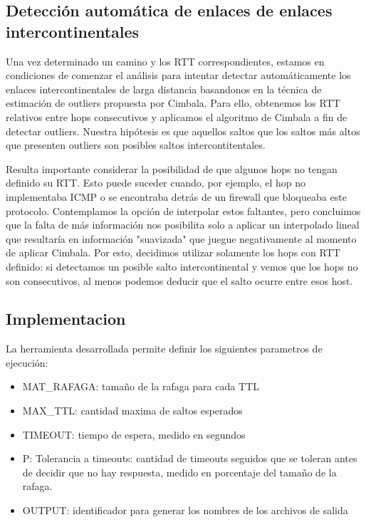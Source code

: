 \subsection{Detección automática de enlaces de enlaces intercontinentales}

Una vez determinado un camino y los RTT correspondientes, estamos en condiciones de comenzar el análisis para intentar detectar automáticamente los enlaces intercontinentales de larga distancia basandonos en la técnica de estimación de outliers propuesta por Cimbala. Para ello, obtenemos los RTT relativos entre hops consecutivos y aplicamos el algoritmo de Cimbala a fin de detectar outliers. Nuestra hipótesis es que aquellos saltos que los saltos más altos que presenten outliers son posibles saltos intercontitentales. 

Resulta importante  considerar la posibilidad de que algunos hops no tengan definido su RTT. Esto puede suceder cuando, por ejemplo, el hop no implementaba ICMP o se encontraba detrás de un firewall que bloqueaba este protocolo. Contemplamos la opción de interpolar estos faltantes, pero concluimos que la falta de más información nos posibilita solo a aplicar un interpolado lineal que resultaría en información "suavizada" que juegue negativamente al momento de aplicar Cimbala. Por esto, decidimos utilizar solamente los hops con RTT definido: si detectamos un posible salto intercontinental y vemos que los hops no son consecutivos, al menos podemos deducir que el salto ocurre entre esos host. 


\subsection{Implementacion}

La herramienta desarrollada permite definir los siguientes parametros de ejecución:
\begin{itemize}
	\item{MAT\_RAFAGA: tamaño de la rafaga para cada TTL}
	\item{MAX\_TTL: cantidad maxima de saltos esperados}
	\item{TIMEOUT: tiempo de espera, medido en segundos }
	\item{P: Tolerancia a timeouts: cantidad de timeouts seguidos que se toleran antes de decidir que no hay respuesta, medido en porcentaje del tamaño de la rafaga.}
	\item{OUTPUT: identificador para generar los nombres de los archivos de salida}
\end{itemize}

